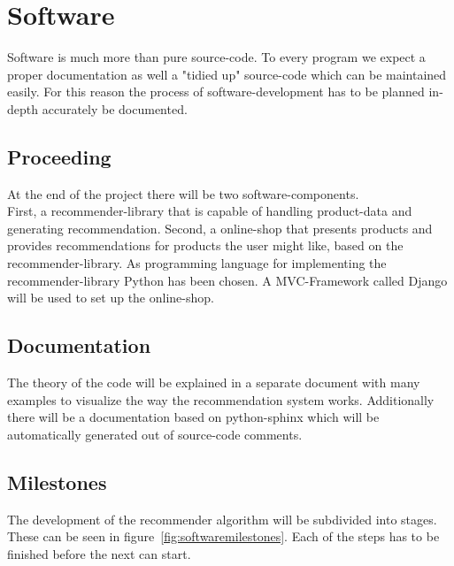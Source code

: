 

\section{Software}
Software is much more than pure source-code.
To every program we expect a proper documentation as well a "tidied up" source-code which can be maintained easily.
For this reason the process of software-development has to be planned in-depth accurately be documented.


\subsection{Proceeding}
At the end of the project there will be two software-components.\\
First, a recommender-library that is capable of handling product-data and generating recommendation.
Second, a online-shop that presents products and provides recommendations for products the user might like, based on the recommender-library.
As programming language for implementing the recommender-library Python has been chosen.
A MVC-Framework called Django will be used to set up the online-shop.

\subsection{Documentation}
The theory of the code will be explained in a separate document with many examples to visualize the way the recommendation system works.
Additionally there will be a documentation based on python-sphinx which will be automatically generated out of source-code comments.


\subsection{Milestones}
The development of the recommender algorithm will be subdivided into stages.
These can be seen in figure~\ref{fig:softwaremilestones}.
Each of the steps has to be finished before the next can start.\\


